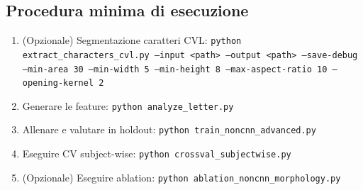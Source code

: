 \documentclass[a4paper,12pt]{article}
\begin{document}
\subsection{Procedura minima di esecuzione}
\begin{enumerate}[leftmargin=1.5em]
  \item (Opzionale) Segmentazione caratteri CVL: \texttt{python extract\_characters\_cvl.py --input <path> --output <path> --save-debug --min-area 30 --min-width 5 --min-height 8 --max-aspect-ratio 10 --opening-kernel 2}
  \item Generare le feature: \texttt{python analyze\_letter.py}
  \item Allenare e valutare in holdout: \texttt{python train\_noncnn\_advanced.py}
  \item Eseguire CV subject-wise: \texttt{python crossval\_subjectwise.py}
  \item (Opzionale) Eseguire ablation: \texttt{python ablation\_noncnn\_morphology.py}
\end{enumerate}
\end{document}
